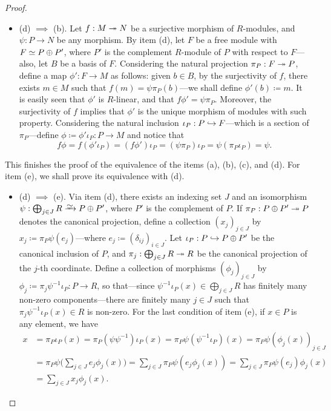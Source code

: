 \begin{proof}
\begin{itemize}
\item (d) \(\implies\) (b). Let \(f: M \twoheadrightarrow N\) be a surjective morphism of
  \(R\)-modules, and \(\psi: P \to N\) be any morphism. By item (d), let \(F\)
  be a free module with \(F \simeq P \oplus P'\), where \(P'\) is the complement
  \(R\)-module of \(P\) with respect to \(F\)---also, let \(B\) be a basis of
  \(F\). Considering the natural projection \(\pi_P: F \twoheadrightarrow P\), define a map
  \(\phi': F \to M\) as follows: given \(b \in B\), by the surjectivity of
  \(f\), there exists \(m \in M\) such that \(f(m) = \psi \pi_P(b)\)---we shall
  define \(\phi'(b) \coloneq m\). It is easily seen that \(\phi'\) is
  \(R\)-linear, and that \(f \phi' = \psi \pi_P\). Moreover, the surjectivity of
  \(f\) implies that \(\phi'\) is the unique morphism of modules with such
  property. Considering the natural inclusion \(\iota_P: P \hookrightarrow F\)---which is a
  section of \(\pi_P\)---define \(\phi \coloneq \phi' \iota_P: P \to M\) and
  notice that
  \[
  f \phi
  = f (\phi' \iota_P)
  = (f \phi') \iota_P
  = (\psi \pi_P) \iota_P
  = \psi (\pi_P \iota_P)
  = \psi.
  \]
\end{itemize}
This finishes the proof of the equivalence of the items (a), (b), (c), and
(d). For item (e), we shall prove its equivalence with (d).
\begin{itemize}\setlength\itemsep{0em}
\item (d) \(\implies\) (e). Via item (d), there exists an indexing set \(J\) and
  an isomorphism \(\psi: \bigoplus_{j \in J} R \isoto P \oplus P'\), where
  \(P'\) is the complement of \(P\). If \(\pi_P: P \oplus P' \twoheadrightarrow P\) denotes
  the canonical projection, define a collection \((x_j)_{j \in J}\) by
  \(x_j \coloneq \pi_P \psi(e_j)\)---where
  \(e_j \coloneq (\delta_{ij})_{i \in J}\). Let \(\iota_P: P \hookrightarrow P \oplus P'\)
  be the canonical inclusion of \(P\), and
  \(\pi_j: \bigoplus_{j \in J} R \twoheadrightarrow R\) be the canonical projection of the
  \(j\)-th coordinate. Define a collection of morphisms \((\phi_j)_{j \in J}\)
  by \(\phi_j \coloneq \pi_j \psi^{-1} \iota_P: P \to R\), so that---since
  \(\psi^{-1} \iota_P(x) \in \bigoplus_{j \in J} R\) has finitely many non-zero
  components---there are finitely many \(j \in J\) such that
  \(\pi_j \psi^{-1} \iota_P(x) \in R\) is non-zero. For the last condition of
  item (e), if \(x \in P\) is any element, we have
  \begin{align*}
  x &= \pi_P \iota_P(x)
  = \pi_P(\psi \psi^{-1}) \iota_P(x)
  = \pi_P \psi (\psi^{-1} \iota_P)(x)
  = \pi_P \psi (\phi_j(x))_{j \in J} \\
  &= \pi_P \psi \bigg( \sum_{j \in J} e_j \phi_j(x) \bigg)
  = \sum_{j \in J} \pi_P \psi(e_j \phi_j(x))
  = \sum_{j \in J} \pi_P \psi(e_j) \phi_j(x) \\
  &= \sum_{j \in J} x_j \phi_j(x).
  \end{align*}


\end{itemize}
\end{proof}
